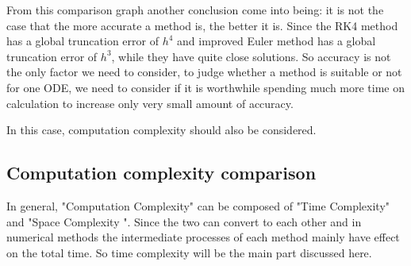 \documentclass[a4paper]{article}
\begin{document}
   From this comparison graph another conclusion come into being: it is not the case that the more accurate a method is, the better it is. Since the RK4 method has a global truncation error of $h^4$ and improved Euler method has a global truncation error of $h^3$, while they have quite close solutions. So accuracy is not the only factor we need to consider, to judge whether a method is suitable or not for one ODE, we need to consider if it is worthwhile spending much more time on calculation to increase only very small amount of accuracy. 
   
   In this case, computation complexity should also be considered.
	
	\subsection{Computation complexity comparison}
	
   In general, "Computation Complexity" can be composed of "Time Complexity" and "Space Complexity ". Since the two can convert to each other and in numerical methods the intermediate processes of each method mainly have effect on the total time. So time complexity will be the main part discussed here.
	
\end{document}
